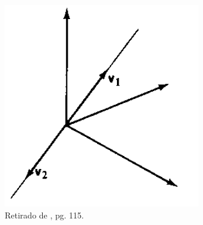 \begin{figure}[H]
	\centering
	\includegraphics[scale=0.90]{cb_exemplo10.png}
	\caption{Retirado de \cite{boldrini1980}, pg. 115.}
\end{figure}

